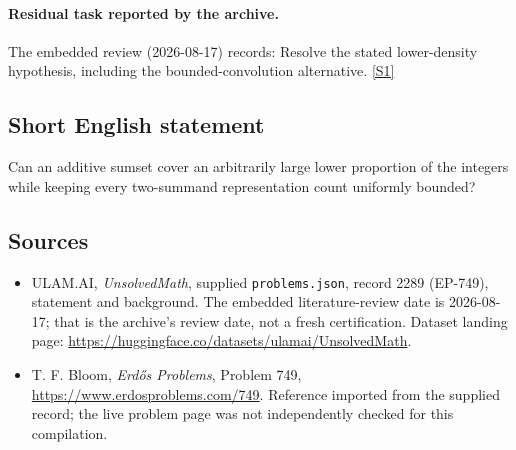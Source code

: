 \documentclass[11pt,a4paper]{article}
\newcommand{\sref}[2]{\hyperlink{source:#1:#2}{[S#2]}}
\begin{document}
\paragraph{Residual task reported by the archive.}

The embedded review (2026-08-17) records: Resolve the stated lower-density hypothesis, including the bounded-convolution alternative. \sref{2289}{1}

\subsection{Short English statement}

Can an additive sumset cover an arbitrarily large lower proportion of the integers while keeping every two-summand representation count uniformly bounded?

\subsection{Sources}

{\small

\begin{itemize}

\item[\hypertarget{source:2289:1}{S1}] ULAM.AI, \emph{UnsolvedMath}, supplied \texttt{problems.json}, record 2289 (EP-749), statement and background. The embedded literature-review date is 2026-08-17; that is the archive’s review date, not a fresh certification. Dataset landing page: \url{https://huggingface.co/datasets/ulamai/UnsolvedMath}.

\item[\hypertarget{source:2289:2}{S2}] T. F. Bloom, \emph{Erdős Problems}, Problem 749, \url{https://www.erdosproblems.com/749}. Reference imported from the supplied record; the live problem page was not independently checked for this compilation.

\end{itemize}

}

\label{end:2289}
\end{document}

